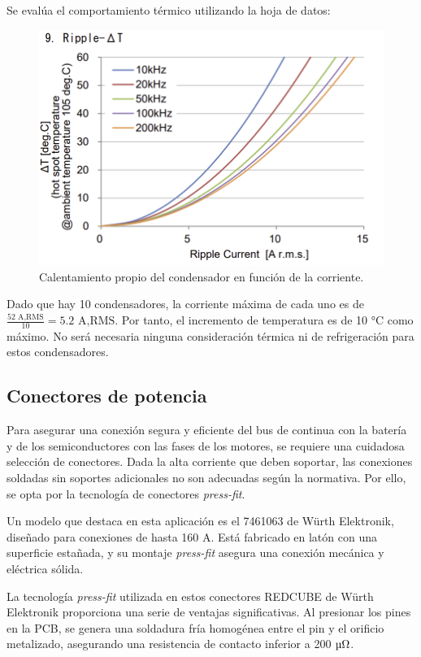 Se evalúa el comportamiento térmico utilizando la hoja de datos:
\begin{figure}[H]
	\centering
	\includegraphics[width=0.7\linewidth]{fig/dc-link-temp}
	\caption{Calentamiento propio del condensador en función de la corriente.}
\end{figure}

Dado que hay 10 condensadores, la corriente máxima de cada uno es de $\frac{52 \text{ A,RMS}}{10} = 5.2 \text{ A,RMS}$. Por tanto, el incremento de temperatura es de 10 °C como máximo. No será necesaria ninguna consideración térmica ni de refrigeración para estos condensadores.

\subsection{Conectores de potencia}

Para asegurar una conexión segura y eficiente del bus de continua con la batería y de los semiconductores con las fases de los motores, se requiere una cuidadosa selección de conectores. Dada la alta corriente que deben soportar, las conexiones soldadas sin soportes adicionales no son adecuadas según la normativa. Por ello, se opta por la tecnología de conectores \textit{press-fit}.

Un modelo que destaca en esta aplicación es el 7461063 de Würth Elektronik, diseñado para conexiones de hasta 160 A. Está fabricado en latón con una superficie estañada, y su montaje \textit{press-fit} asegura una conexión mecánica y eléctrica sólida.

La tecnología \textit{press-fit} utilizada en estos conectores REDCUBE de Würth Elektronik proporciona una serie de ventajas significativas. Al presionar los pines en la PCB, se genera una soldadura fría homogénea entre el pin y el orificio metalizado, asegurando una resistencia de contacto inferior a 200 $\text{\unit{\micro\ohm}}$.

